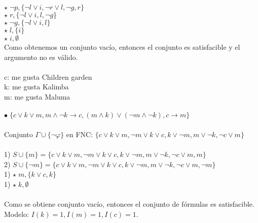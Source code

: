 \documentclass{article}
\begin{document}
$\star \; \neg p, \{\neg l \lor i, \neg r \lor l,\neg g,r\}$\\
$\star \; r, \{\neg l \lor i, l, \neg g\}$\\
$\star \; \neg g, \{\neg l \lor i,l\}$\\
$\star \; l, \{i\}$\\
$\star \; i, \emptyset$\\
Como obtenemos un conjunto vacío, entonces el conjunto es satisfacible y el argumento no es válido.\\ \ \\
c: me gusta Children garden\\
k: me gusta Kalimba\\
m: me gusta Maluma\\ \ \\
$\bullet \; \{c \lor k \lor m, m \land \neg k \rightarrow c, (m \land k) \lor (\neg m \land \neg k), c \rightarrow m\}$\\ \ \\
Conjunto $\Gamma \cup \{\neg \varphi \}$ en FNC: $\{c \lor k \lor m, \neg m \lor k \lor c, k \lor \neg m, m \lor \neg k, \neg c \lor m\}$\\ \ \\
1) $S \cup \{ m \} = \{c \lor k \lor m, \neg m \lor k \lor c, k \lor \neg m, m \lor \neg k, \neg c \lor m, m\}$\\
2) $S \cup \{ \neg m \} = \{c \lor k \lor m, \neg m \lor k \lor c, k \lor \neg m, m \lor \neg k, \neg c \lor m, \neg m\}$ \\
1) $\star \; m, \{k \lor c, k\}$\\
1) $\star \; k, \emptyset$\\ \ \\
Como se obtiene conjunto vacío, entonces el conjunto de fórmulas es satisfacible.\\
Modelo: $I(k)=1, I(m)=1, I(c)=1$.
\end{document}
